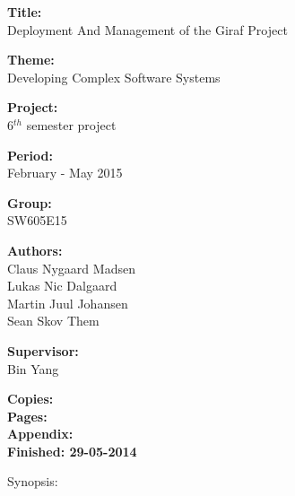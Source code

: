 \begin{minipage}[t]{0.48\textwidth}
\textbf{Title:} \\[5pt]\bigskip\hspace{2ex}
Deployment And Management of the Giraf Project

\textbf{Theme:} \\[5pt]\bigskip\hspace{2ex}
Developing Complex Software Systems

\textbf{Project:} \\[5pt]\bigskip\hspace{2ex}
6$^{th}$ semester project

\textbf{Period:} \\[5pt]\bigskip\hspace{2ex}
February - May 2015

\textbf{Group:} \\[5pt]\bigskip\hspace{2ex}
SW605E15	

\textbf{Authors:} \\[5pt]\hspace*{2ex}
Claus Nygaard Madsen\\\hspace*{2ex}
Lukas Nic Dalgaard \\\hspace*{2ex}
Martin Juul Johansen \\\hspace*{2ex}
Sean Skov Them \\\hspace*{2ex}

\textbf{Supervisor:} \\[5pt]\hspace*{2ex}
Bin Yang \\\bigskip\hspace{2ex}

\textbf{Copies: } \\
\textbf{Pages: } \\
\textbf{Appendix: } \\ 
\textbf{Finished: 29-05-2014}

\end{minipage}
\hfill
\begin{minipage}[t]{0.5\textwidth}
\vspace{1cm}
Synopsis: \\[5pt]
\fbox{\parbox{7cm}{\bigskip\bigskip}} %
\end{minipage}

